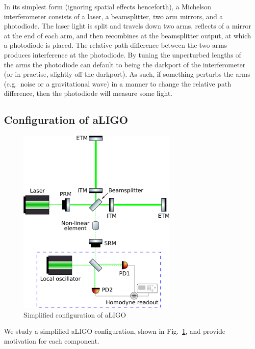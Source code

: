 \documentclass[aps,pra,superscriptaddress,reprint,nofootinbib]{revtex4-1}
\begin{document}
In its simplest form (ignoring spatial effects henceforth), a Michelson interferometer consists of a laser, a beamsplitter, two arm mirrors, and a photodiode. The laser light is split and travels down two arms, reflects of a mirror at the end of each arm, and then recombines at the beamsplitter output, at which a photodiode is placed. The relative path difference between the two arms produces interference at the photodiode. By tuning the unperturbed lengths of the arms the photodiode can default to being the darkport of the interferometer (or in practise, slightly off the darkport). As such, if something perturbs the arms (e.g.\ noise or a gravitational wave) in a manner to change the relative path difference, then the photodiode will measure some light.


\subsection{Configuration of aLIGO}

\begin{figure}
	\begin{center}
	\includegraphics[width=0.7\textwidth]{figures/aLIGO_internal_squeezing.pdf}
	\end{center}
	\caption{Simplified configuration of aLIGO}
	\label{fig:aLIGO_configuration}
\end{figure}
We study a simplified aLIGO configuration, shown in Fig.~\ref{fig:aLIGO_configuration}, and provide motivation for each component.
\end{document}
